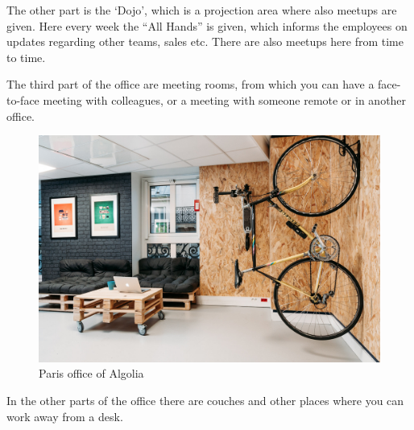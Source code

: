 The other part is the `Dojo', which is a projection area where also meetups are given. Here every week the ``All Hands'' is given, which informs the employees on updates regarding other teams, sales etc. There are also meetups here from time to time.

The third part of the office are meeting rooms, from which you can have a face-to-face meeting with colleagues, or a meeting with someone remote or in another office.

\begin{figure}[H]
  \label{figure:company-logo}
  \centering
  \includegraphics[width=\textwidth]{../assets/officelovin.jpg}
  \caption{Paris office of Algolia\cite{officelovin}}
\end{figure}

In the other parts of the office there are couches and other places where you can work away from a desk.

